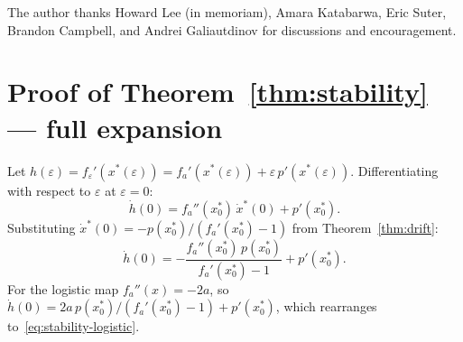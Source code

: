 \documentclass[aps,pre,twocolumn,superscriptaddress,nofootinbib,
               longbibliography,floatfix]{revtex4-2}
\newcommand{\eps}{\varepsilon}
\theoremstyle{plain}
\theoremstyle{remark}
\begin{document}
\begin{acknowledgments}
The author thanks Howard Lee (in memoriam), Amara Katabarwa,
Eric Suter, Brandon Campbell, and Andrei Galiautdinov for
discussions and encouragement.
\end{acknowledgments}

\appendix

\section{Proof of Theorem~\ref{thm:stability} — full expansion}
\label{app:stability}

Let $h(\eps) = f_\eps'(x^*(\eps)) = f_a'(x^*(\eps)) + \eps\,p'(x^*(\eps))$.
Differentiating with respect to $\eps$ at $\eps=0$:
%
\begin{equation}
  \dot{h}(0) = f_a''(x^*_0)\,\dot{x}^*(0) + p'(x^*_0).
\end{equation}
%
Substituting $\dot{x}^*(0) = -p(x^*_0)/(f_a'(x^*_0)-1)$
from Theorem~\ref{thm:drift}:
%
\begin{equation}
  \dot{h}(0)
  = -\frac{f_a''(x^*_0)\,p(x^*_0)}{f_a'(x^*_0)-1} + p'(x^*_0).
\end{equation}
%
For the logistic map $f_a''(x) = -2a$, so
$\dot{h}(0) = 2a\,p(x^*_0)/(f_a'(x^*_0)-1) + p'(x^*_0)$,
which rearranges to~\eqref{eq:stability-logistic}.


\end{document}
